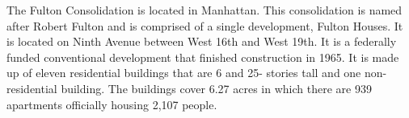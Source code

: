 The Fulton Consolidation is located in Manhattan. This consolidation is named after Robert Fulton and is comprised of a single development, Fulton Houses. It is located on Ninth Avenue between West 16th and West 19th. It is a federally funded conventional development that finished construction in 1965. It is made up of eleven residential buildings that are 6 and 25- stories tall and one non-residential building. The buildings cover 6.27 acres in which there are 939 apartments officially housing 2,107 people.